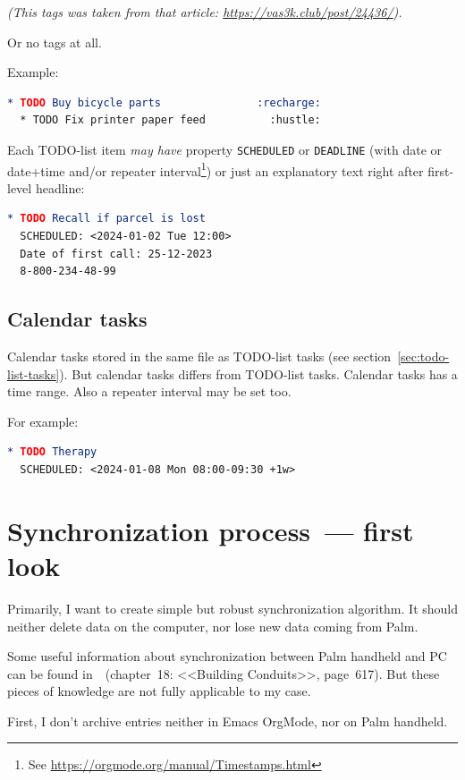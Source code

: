 \documentclass[a4paper,12pt,oneside]{scrartcl}
\begin{document}
\textit{(This tags was taken from that article:
  \url{https://vas3k.club/post/24436/}).}

Or no tags at all.

Example:
\begin{lstlisting}[language=org]
  * TODO Buy bicycle parts               :recharge:
  * TODO Fix printer paper feed          :hustle:
\end{lstlisting}

Each TODO-list item \textit{may have} property \texttt{SCHEDULED} or
\texttt{DEADLINE} (with date or date+time and/or repeater interval\footnote{See
  \url{https://orgmode.org/manual/Timestamps.html}}) or just an explanatory text
right after first-level headline:
\begin{lstlisting}[language=org]
  * TODO Recall if parcel is lost
  SCHEDULED: <2024-01-02 Tue 12:00>
  Date of first call: 25-12-2023
  8-800-234-48-99
\end{lstlisting}

\subsection{Calendar tasks}
\label{sec:calendar-tasks}

Calendar tasks stored in the same file as TODO-list tasks (see
section~\ref{sec:todo-list-tasks}). But calendar tasks differs from TODO-list
tasks. Calendar tasks has a time range. Also a repeater interval may be set too.

For example:
\begin{lstlisting}[language=org]
  * TODO Therapy
  SCHEDULED: <2024-01-08 Mon 08:00-09:30 +1w>
\end{lstlisting}

\section{Synchronization process~--- first look}
\label{sec:synchr-scen-first-look}

Primarily, I want to create simple but robust synchronization algorithm. It
should neither delete data on the computer, nor lose new data coming from Palm.

Some useful information about synchronization between Palm handheld and PC can
be found in~\cite{PalmProgrammingBible}~(chapter~18: <<Building Conduits>>,
page~617). But these pieces of knowledge are not fully applicable to my case.

First, I don't archive entries neither in Emacs OrgMode, nor on Palm handheld.
\end{document}
